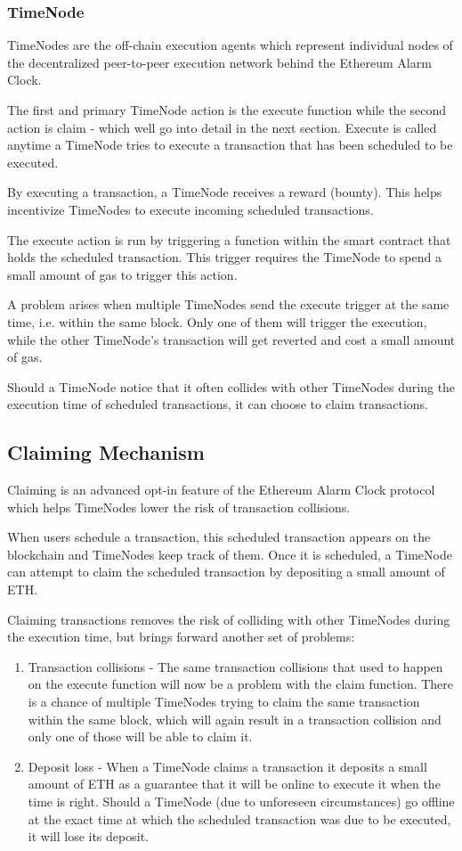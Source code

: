 \documentclass{article}
\begin{document}
{  \subsubsection{TimeNode}
  TimeNodes are the off-chain execution agents which represent individual nodes of the decentralized peer-to-peer execution network behind the Ethereum Alarm Clock.
    
  The first and primary TimeNode action is the execute function while the second action is claim - which well go into detail in the next section. Execute is called anytime a TimeNode tries to execute a transaction that has been scheduled to be executed.
  
  By executing a transaction, a TimeNode receives a reward (bounty). This helps incentivize TimeNodes to execute incoming scheduled transactions.
   
  The execute action is run by triggering a function within the smart contract that holds the scheduled transaction. This trigger requires the TimeNode to spend a small amount of gas to trigger this action.
   
  A problem arises when multiple TimeNodes send the execute trigger at the same time, i.e. within the same block. Only one of them will trigger the execution, while the other TimeNode’s transaction will get reverted and cost a small amount of gas.
   
  Should a TimeNode notice that it often collides with other TimeNodes during the execution time of scheduled transactions, it can choose to claim transactions.
  
  \subsection{Claiming Mechanism}
  Claiming is an advanced opt-in feature of the Ethereum Alarm Clock protocol which helps TimeNodes lower the risk of transaction collisions.

  When users schedule a transaction, this scheduled transaction appears on the blockchain and TimeNodes keep track of them. Once it is scheduled, a TimeNode can attempt to claim the scheduled transaction by depositing a small amount of ETH.
  
  Claiming transactions removes the risk of colliding with other TimeNodes during the execution time, but brings forward another set of problems:
  \begin{enumerate}
    \item Transaction collisions - The same transaction collisions that used to happen on the execute function will now be a problem with the claim function. There is a chance of multiple TimeNodes trying to claim the same transaction within the same block, which will again result in a transaction collision and only one of those will be able to claim it.
    \item Deposit loss - When a TimeNode claims a transaction it deposits a small amount of ETH as a guarantee that it will be online to execute it when the time is right. Should a TimeNode (due to unforeseen circumstances) go offline at the exact time at which the scheduled transaction was due to be executed, it will lose its deposit.
  \end{enumerate}
}
\end{document}
